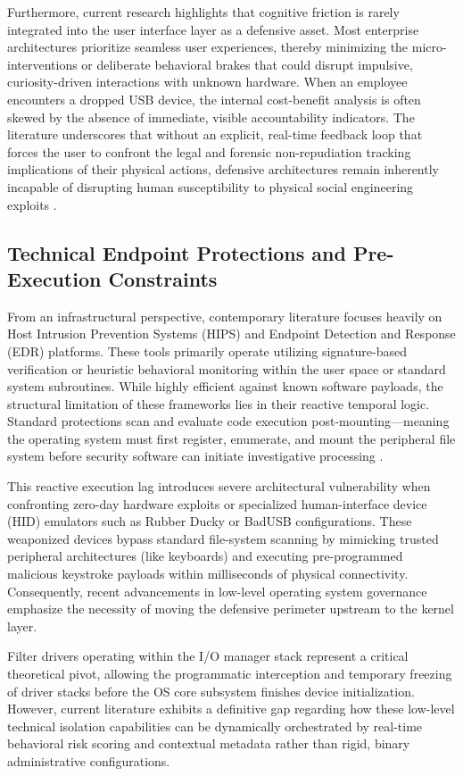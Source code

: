 \documentclass{ieeeaccess}
\begin{document}
Furthermore, current research highlights that cognitive friction is rarely integrated into the user interface layer as a defensive asset. Most enterprise architectures prioritize seamless user experiences, thereby minimizing the micro-interventions or deliberate behavioral brakes that could disrupt impulsive, curiosity-driven interactions with unknown hardware. When an employee encounters a dropped USB device, the internal cost-benefit analysis is often skewed by the absence of immediate, visible accountability indicators. The literature underscores that without an explicit, real-time feedback loop that forces the user to confront the legal and forensic non-repudiation tracking implications of their physical actions, defensive architectures remain inherently incapable of disrupting human susceptibility to physical social engineering exploits \cite{ref11}.

\subsection{Technical Endpoint Protections and Pre-Execution Constraints}
From an infrastructural perspective, contemporary literature focuses heavily on Host Intrusion Prevention Systems (HIPS) and Endpoint Detection and Response (EDR) platforms. These tools primarily operate utilizing signature-based verification or heuristic behavioral monitoring within the user space or standard system subroutines. While highly efficient against known software payloads, the structural limitation of these frameworks lies in their reactive temporal logic. Standard protections scan and evaluate code execution post-mounting—meaning the operating system must first register, enumerate, and mount the peripheral file system before security software can initiate investigative processing .

This reactive execution lag introduces severe architectural vulnerability when confronting zero-day hardware exploits or specialized human-interface device (HID) emulators such as Rubber Ducky or BadUSB configurations. These weaponized devices bypass standard file-system scanning by mimicking trusted peripheral architectures (like keyboards) and executing pre-programmed malicious keystroke payloads within milliseconds of physical connectivity. Consequently, recent advancements in low-level operating system governance emphasize the necessity of moving the defensive perimeter upstream to the kernel layer.

Filter drivers operating within the I/O manager stack represent a critical theoretical pivot, allowing the programmatic interception and temporary freezing of driver stacks before the OS core subsystem finishes device initialization. However, current literature exhibits a definitive gap regarding how these low-level technical isolation capabilities can be dynamically orchestrated by real-time behavioral risk scoring and contextual metadata rather than rigid, binary administrative configurations.
\end{document}
